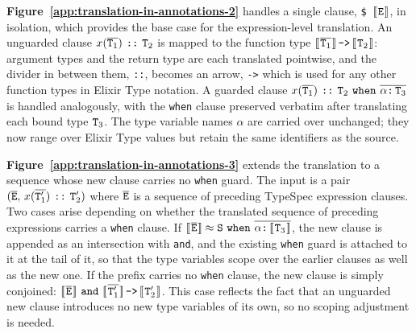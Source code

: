 \textbf{Figure~\ref{app:translation-in-annotations-2}} handles a single clause, \texttt{\$\,$[\![\hspace{.07em}\texttt{E}\hspace{.07em}]\!]$}, in isolation, which provides the base case for the expression-level translation.
An unguarded clause $x(\overline{\texttt{T}_1})\texttt{\,\,::\,\,}\texttt{T}_2$ is mapped to the function type $[\![\hspace{.07em}\overline{\texttt{T}_1}\hspace{.07em}]\!]\,\texttt{->}\,[\![\hspace{.07em}\texttt{T}_2\hspace{.07em}]\!]$: argument types and the return type are each translated pointwise, and the divider in between them, \texttt{::}, becomes an arrow, \texttt{->} which is used for any other function types in Elixir Type notation.
A guarded clause $x(\overline{\texttt{T}_1})\texttt{\,\,::\,\,}\texttt{T}_2\texttt{\,\,when\,\,}\overline{\alpha\texttt{:\,}\texttt{T}_3}$ is handled analogously, with the \texttt{when} clause preserved verbatim after translating each bound type $\texttt{T}_3$.
The type variable names $\alpha$ are carried over unchanged; they now range over Elixir Type values but retain the same identifiers as the source.

\textbf{Figure~\ref{app:translation-in-annotations-3}} extends the translation to a sequence whose new clause carries no \texttt{when} guard.
The input is a pair $(\overline{\texttt{E}},\,x(\overline{\texttt{T}_1^{\prime}})\texttt{\,\,::\,\,}\texttt{T}_2^{\prime})$ where $\overline{\texttt{E}}$ is a sequence of preceding TypeSpec expression clauses.
Two cases arise depending on whether the translated sequence of preceding expressions carries a \texttt{when} clause.
If $[\![\hspace{.07em}\overline{\texttt{E}}\hspace{.07em}]\!] \approx \texttt{S}\texttt{\,\,when\,\,}\overline{\alpha\texttt{:\,}[\![\hspace{.07em}\texttt{T}_3\hspace{.07em}]\!]}$, the new clause is appended as an intersection with \texttt{and}, and the existing \texttt{when} guard is attached to it at the tail of it, so that the type variables scope over the earlier clauses as well as the new one.
If the prefix carries no \texttt{when} clause, the new clause is simply conjoined: $[\![\hspace{.07em}\overline{\texttt{E}}\hspace{.07em}]\!]\texttt{\,\,and\,\,}[\![\hspace{.07em}\overline{\texttt{T}_1^{\prime}}\hspace{.07em}]\!]\,\texttt{->}\,[\![\hspace{.07em}\texttt{T}_2^{\prime}\hspace{.07em}]\!]$.
This case reflects the fact that an unguarded new clause introduces no new type variables of its own, so no scoping adjustment is needed.

